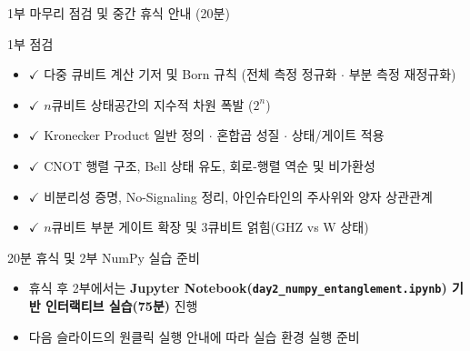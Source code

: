 \documentclass[aspectratio=169, 10pt]{beamer}
\begin{document}
\begin{frame}{1부 마무리 점검 및 중간 휴식 안내 (20분)}
    \begin{qcblock}{1부 점검}
        \begin{itemize}
            \item $\checkmark$ 다중 큐비트 계산 기저 및 Born 규칙 (전체 측정 정규화 $\cdot$ 부분 측정 재정규화)
            \item $\checkmark$ $n$큐비트 상태공간의 지수적 차원 폭발 ($2^n$)
            \item $\checkmark$ Kronecker Product 일반 정의 $\cdot$ 혼합곱 성질 $\cdot$ 상태/게이트 적용
            \item $\checkmark$ CNOT 행렬 구조, Bell 상태 유도, 회로-행렬 역순 및 비가환성
            \item $\checkmark$ 비분리성 증명, No-Signaling 정리, 아인슈타인의 주사위와 양자 상관관계
            \item $\checkmark$ $n$큐비트 부분 게이트 확장 및 3큐비트 얽힘(GHZ vs W 상태)
        \end{itemize}
    \end{qcblock}
    \vspace{0.25cm}
    \begin{qctip}{20분 휴식 및 2부 NumPy 실습 준비}
        \begin{itemize}
            \item 휴식 후 2부에서는 \textbf{Jupyter Notebook(\texttt{day2\_numpy\_entanglement.ipynb}) 기반 인터랙티브 실습(75분)} 진행
            \item 다음 슬라이드의 원클릭 실행 안내에 따라 실습 환경 실행 준비
        \end{itemize}
    \end{qctip}
\end{frame}
\end{document}
